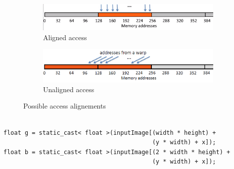 \documentclass[a4paper]{article}
\begin{document}
\begin{figure}[!ht]
\begin{subfigure}{0.5\textwidth}
\centering
\includegraphics[width=\linewidth]{caching}
\caption{Aligned access}
\label{fig:ca}
\end{subfigure}
\begin{subfigure}{0.5\textwidth}
\centering
\includegraphics[width=\linewidth]{caching2}
\caption{Unaligned access}
\label{fig:uca}
\end{subfigure}
\caption{Possible access alignements}
 \label{fig:ucca}
\end{figure}
\FloatBarrier

\begin{lstlisting}[label=div, caption=Unaligned accesses]

float g = static_cast< float >(inputImage[(width * height) +
                                          (y * width) + x]);
float b = static_cast< float >(inputImage[(2 * width * height) +
                                          (y * width) + x]);

\end{lstlisting}
\FloatBarrier
\end{document}
